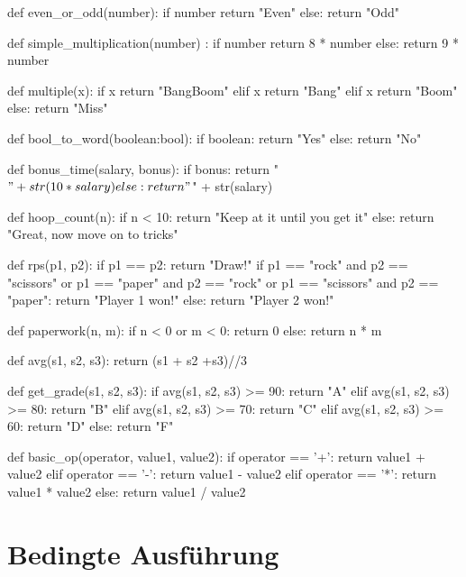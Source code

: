 \documentclass[class=scrartcl, crop=false]{standalone}
\newcommand{\expandpyconc}[1]{\expandafter\reallyexpandpyconc\expandafter{#1}}
\newcommand{\reallyexpandpyconc}[1]{\pyconc{exec(compile(open('#1', 'rb').read(), '#1', 'exec'))}}
\newenvironment{pyconcodeblck}[1]
{\newcommand{\snippetfile}{snippet-#1.py}
	\VerbatimEnvironment
	\begin{VerbatimOut}{\snippetfile}}
	{\end{VerbatimOut}
	\expandpyconc{\snippetfile}}
\begin{document}
\begin{pyconcodeblck}{bedingte_ausführung}



def even_or_odd(number):
    if number %
        return "Even"
    else:
        return "Odd"

def simple_multiplication(number) :
    if number %
        return 8 * number 
    else:
        return 9 * number

def multiple(x):
    if x %
        return "BangBoom"
    elif x %
        return "Bang"
    elif x %
        return "Boom"
    else:
        return "Miss"




def bool_to_word(boolean:bool):
    if boolean:
        return "Yes"
    else:
        return "No"

def bonus_time(salary, bonus):
    if bonus:
        return "$" + str(10 * salary)
    else:
        return "$" + str(salary)

def hoop_count(n):
    if n < 10:
        return "Keep at it until you get it"
    else:
        return "Great, now move on to tricks"


def rps(p1, p2):
    if p1 == p2:
        return "Draw!"
    if p1 == "rock" and p2 == "scissors" or p1 == "paper" and p2 == "rock" or p1 == "scissors" and p2 == "paper":
        return "Player 1 won!"
    else:
        return "Player 2 won!"


def paperwork(n, m):
    if n < 0 or m < 0:
        return 0
    else:
        return n * m


def avg(s1, s2, s3):
    return (s1 + s2 +s3)//3

def get_grade(s1, s2, s3):
    if avg(s1, s2, s3) >= 90:
        return "A"
    elif avg(s1, s2, s3) >= 80:
        return "B"
    elif avg(s1, s2, s3) >= 70:
        return "C"
    elif avg(s1, s2, s3) >= 60:
        return "D"
    else:
        return "F"



def basic_op(operator, value1, value2):
    if operator == '+':
        return value1 + value2
    elif operator == '-':
        return value1 - value2
    elif operator == '*':
        return value1 * value2
    else:
        return value1 / value2

\end{pyconcodeblck}

\section{Bedingte Ausführung}
\end{document}

